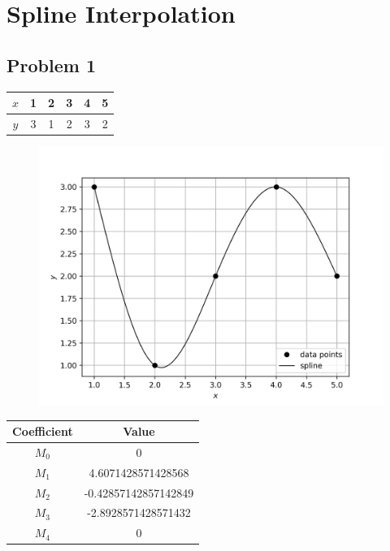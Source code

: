 \documentclass[12,a4paper]{article}
\begin{document}
    \section{Spline Interpolation}
    \subsection*{Problem 1}
    \begin{table}[H]
        \centering
        \begin{tabular}{ |c|c|c|c|c|c| }
            \hline
            $x$ & 1 & 2 & 3 & 4 & 5\\
            \hline
            $y$ & 3 & 1 & 2 & 3 & 2\\
            \hline
        \end{tabular}
    \end{table}
    \begin{figure}[H]
        \centering
        \includegraphics[width=\textwidth]{plots/q3a.png}
        \label{fig:my_label}
    \end{figure}
    \begin{table}[H]
        \centering
        \begin{tabular}{ |c|c|}
            \hline
            \textbf{Coefficient} & \textbf{Value}\\
            \hline
            $M_0$ & 0\\
            $M_1$ & 4.6071428571428568\\
            $M_2$ & -0.42857142857142849\\
            $M_3$ & -2.8928571428571432\\
            $M_4$ & 0\\
            \hline
        \end{tabular}
    \end{table}
    \newpage
\end{document}
